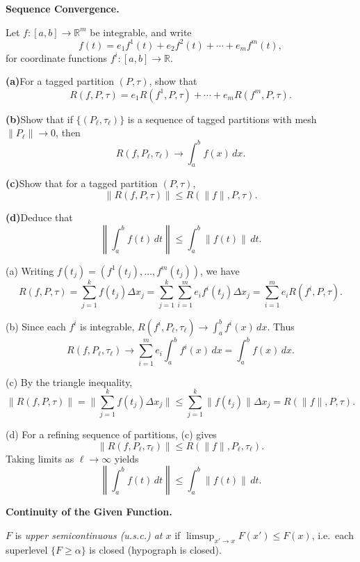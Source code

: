 \begin{problem}[CP-II-0350]
\label{prob:cp-ii-0350}
\textbf{Sequence Convergence.}

\hspace*{1.5em}Let $f:[a,b]\to\mathbb{R}^m$ be integrable, and write
\[
f(t) = e_1 f^1(t) + e_2 f^2(t) + \cdots + e_m f^m(t),
\]
for coordinate functions $f^i:[a,b]\to\mathbb{R}$.

	\par\smallskip\noindent\textbf{(a)}\quad For a tagged partition $(P,\tau)$, show that
	\[
	R(f,P,\tau) = e_1 R(f^1,P,\tau)+\cdots+e_m R(f^m,P,\tau).
	\]

	\par\smallskip\noindent\textbf{(b)}\quad Show that if $\{(P_\ell,\tau_\ell)\}$ is a sequence of tagged partitions with mesh $\|P_\ell\|\to 0$, then
	\[
	R(f,P_\ell,\tau_\ell)\to \int_a^b f(x)\,dx.
	\]

	\par\smallskip\noindent\textbf{(c)}\quad Show that for a tagged partition $(P,\tau)$,
	\[
	\|R(f,P,\tau)\| \leq R(\|f\|,P,\tau).
	\]

	\par\smallskip\noindent\textbf{(d)}\quad Deduce that
	\[
	\left\|\int_a^b f(t)\,dt\right\| \leq \int_a^b \|f(t)\|\,dt.
	\]
\end{problem}

\begin{solution}
(a) Writing $f(t_j)=(f^1(t_j),\dots,f^m(t_j))$, we have
	\[
	R(f,P,\tau) = \sum_{j=1}^k f(t_j)\Delta x_j
	= \sum_{j=1}^k \sum_{i=1}^m e_i f^i(t_j)\Delta x_j
	= \sum_{i=1}^m e_i R(f^i,P,\tau).
	\]

	(b) Since each $f^i$ is integrable, $R(f^i,P_\ell,\tau_\ell)\to\int_a^b f^i(x)\,dx$.
	Thus
	\[
	R(f,P_\ell,\tau_\ell)\to \sum_{i=1}^m e_i \int_a^b f^i(x)\,dx
	=\int_a^b f(x)\,dx.
	\]

	(c) By the triangle inequality,
	\[
	\|R(f,P,\tau)\| = \Big\|\sum_{j=1}^k f(t_j)\Delta x_j\Big\|
	\leq \sum_{j=1}^k \|f(t_j)\|\Delta x_j
	= R(\|f\|,P,\tau).
	\]

	(d) For a refining sequence of partitions, (c) gives
	\[
	\|R(f,P_\ell,\tau_\ell)\|\leq R(\|f\|,P_\ell,\tau_\ell).
	\]
	Taking limits as $\ell\to\infty$ yields
	\[
	\left\|\int_a^b f(t)\,dt\right\|\leq \int_a^b \|f(t)\|\,dt.
	\]
\end{solution}

\begin{problem}[CP-II-0351]
\label{prob:cp-ii-0351}
\textbf{Continuity of the Given Function.}

\hspace*{1.5em}$F$ is \emph{upper semicontinuous (u.s.c.) at $x$} if
		$\displaystyle \limsup_{x'\to x} F(x') \le F(x)$, i.e.\ each superlevel
		$\{F\ge \alpha\}$ is closed (hypograph is closed).
\end{problem}

